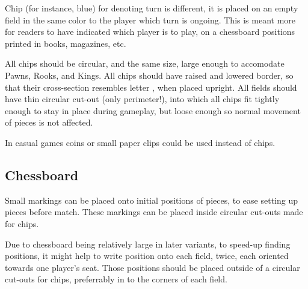 Chip (for instance, blue) for denoting turn is different, it is placed on an
empty field in the same color to the player which turn is ongoing. This is
meant more for readers to have indicated which player is to play, on a
chessboard positions printed in books, magazines, etc.

All chips should be circular, and the same size, large enough to accomodate
Pawns, Rooks, and Kings. All chips should have raised and lowered border, so
that their cross-section resembles letter , when placed upright.
All fields should have thin circular cut-out (only perimeter!), into which
all chips fit tightly enough to stay in place during gameplay, but loose
enough so normal movement of pieces is not affected.

In casual games coins or small paper clips could be used instead of chips.


\subsection*{Chessboard}
\label{sec:Remarks/Chessboard}

Small markings can be placed onto initial positions of pieces, to ease setting
up pieces before match. These markings can be placed inside circular cut-outs
made for chips.

Due to chessboard being relatively large in later variants, to speed-up finding
positions, it might help to write  position onto each field, twice,
each oriented towards one player's seat. Those  positions should be
placed outside of a circular cut-outs for chips, preferrably in to the corners
of each field.

\clearpage %
